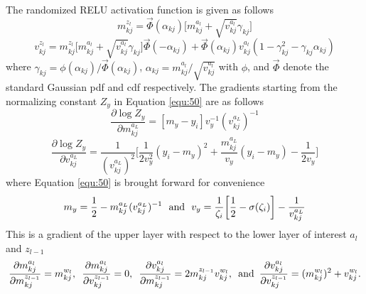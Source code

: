\documentclass[]{article}
\begin{document}
The randomized RELU activation function is given as follows
\begin{equation}
	m_{kj}^{z_l} = \vec{\Phi}(\alpha_{kj}) \bigg[m_{kj}^{a_l} + \sqrt{v_{kj}^{a_l}}\gamma_{kj}\bigg]
	\label{equ:73}
\end{equation}
\begin{equation}
	v_{kj}^{z_l} = m_{kj}^{z_l} \bigg[m_{kj}^{a_l} + \sqrt{v_{kj}^{a_l}}\gamma_{kj}\bigg] \vec{\Phi}(-\alpha_{kj}) + \vec{\Phi}(\alpha_{kj})v_{kj}^{a_l}(1-\gamma_{kj}^2 - \gamma_{kj}\alpha_{kj})
	\label{equ:74}
\end{equation}
where $\gamma_{kj} = \phi(\alpha_{kj})/\vec{\Phi}(\alpha_{kj})$, $\alpha_{kj} = m_{kj}^{a_l} / \sqrt{v_{kj}^{a_l}}$ with $\phi$, and $\vec{\Phi}$ denote the standard Gaussian pdf and cdf respectively.
The gradients starting from the normalizing constant $Z_y$ in Equation \ref{equ:50} are as follows
\begin{equation}
	\frac{\partial\log Z_y}{\partial m^{a_L}_{kj}} = [m_y - y_i]v_y^{-1}(v_{kj}^{a_L})^{-1}
	\label{equ:75}
\end{equation}
\begin{equation}
	\frac{\partial\log Z_y}{\partial v^{a_L}_{kj}} = \frac{1}{(v^{a_L}_{kj})^2}\bigg[\frac{1}{2v_y^2}(y_i-m_y)^2 + \frac{m_{kj}^{a_L}}{v_y}(y_i-m_y) - \frac{1}{2v_y}\bigg]
	\label{equ:76}
\end{equation}
where Equation \ref{equ:50} is brought forward for convenience
\begin{equation}
	m_y = \frac{1}{2} - m^{a_L}_{kj} (v^{a_L}_{kj})^{-1} \hspace{0.09in} \text{and} \hspace{0.09in} v_y = \frac{1}{\zeta_i}\bigg[\frac{1}{2} - \sigma(\zeta_i)\bigg] - \frac{1}{v^{a_L}_{kj}}
	\label{equ:77}
\end{equation}
This is a gradient of the upper layer with respect to the lower layer of interest $a_{l}$ and $z_{l-1}$
\begin{equation}
	\frac{\partial m_{kj}^{a_l}}{\partial m_{kj}^{z_{l-1}}} = m_{kj}^{w_l}, \hspace{0.07in} \frac{\partial m_{kj}^{a_l}}{\partial v_{kj}^{z_{l-1}}} = 0, \hspace{0.07in} \frac{\partial v_{kj}^{a_l}}{\partial m_{kj}^{z_{l-1}}} = 2m_{kj}^{z_{l-1}}v_{kj}^{w_l}, \hspace{0.07in} \text{and} \hspace{0.07in} \frac{\partial v_{kj}^{a_l}}{\partial v_{kj}^{z_{l-1}}} = (m_{kj}^{w_l})^2 + v_{kj}^{w_l}.  
	\label{equ:78}
\end{equation}
\end{document}

